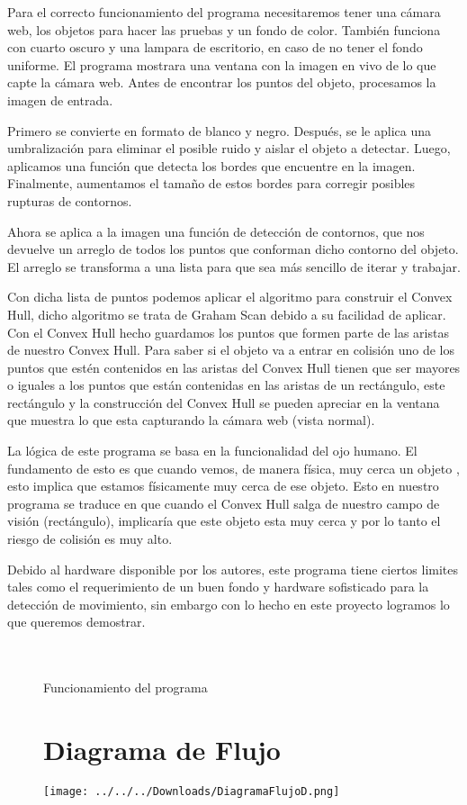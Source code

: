 \documentclass[11pt]{article}
\begin{document}
Para el correcto funcionamiento del programa necesitaremos tener una cámara web, los objetos para hacer las pruebas y un fondo de color. También funciona con cuarto oscuro y una lampara de escritorio, en caso de no tener el fondo uniforme. El programa mostrara una ventana con la imagen en vivo de lo que capte la cámara web. Antes de encontrar los puntos del objeto, procesamos la imagen de entrada.


Primero se convierte en formato de blanco y negro. Después, se le aplica una umbralización para eliminar el posible ruido y aislar el objeto a detectar. Luego, aplicamos una función que detecta los bordes que encuentre en la imagen. Finalmente, aumentamos el tamaño de estos bordes para corregir posibles rupturas de contornos.

Ahora se aplica a la imagen una función de detección de contornos, que nos devuelve un arreglo de todos los puntos que conforman dicho contorno del objeto. El arreglo se transforma a una lista para que sea más sencillo de iterar y trabajar.

Con dicha lista de puntos podemos aplicar el algoritmo para construir el Convex Hull, dicho algoritmo se trata de Graham Scan debido a su facilidad de aplicar. Con el Convex Hull hecho guardamos los puntos que formen parte de las aristas de nuestro Convex Hull. Para saber si el objeto va a entrar en colisión uno de los puntos que estén contenidos en las aristas del Convex Hull tienen que ser mayores o iguales a los puntos que están contenidas en las aristas de un rectángulo, este rectángulo y la construcción del Convex Hull se pueden apreciar en la ventana que muestra lo que esta capturando la cámara web (vista normal).

La lógica de este programa se basa en la funcionalidad del ojo humano. El fundamento de esto es que cuando vemos, de manera física, muy cerca un objeto , esto implica que estamos físicamente muy cerca de ese objeto. Esto en nuestro programa se traduce en que cuando el Convex Hull salga de nuestro campo de visión (rectángulo), implicaría que este objeto esta muy cerca y por lo tanto el riesgo de colisión es muy alto.

Debido al hardware disponible por los autores, este programa tiene ciertos limites tales como el requerimiento de un buen fondo y hardware sofisticado para la detección de movimiento, sin embargo con lo hecho en este proyecto logramos lo que queremos demostrar.\\\\\\
\begin{figure}[h!]
\centering
{}
\caption{Funcionamiento del programa}
\end{figure} 
\begin{figure}[h!]
\section{Diagrama de Flujo}
\centering
\texttt{[image: ../../../Downloads/DiagramaFlujoD.png]}
\end{figure}
\end{document}
